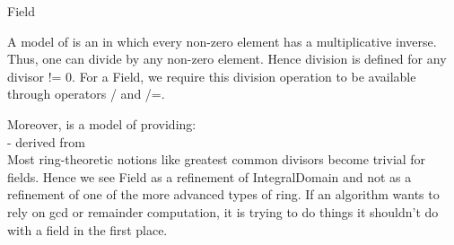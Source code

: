 \begin{ccRefConcept}{Field}


\ccDefinition

A model of  is an in which every non-zero element
has a multiplicative inverse. 
Thus, one can divide by any non-zero element. 
Hence division is defined for any divisor != 0. 
For a Field, we require this division operation to be available through 
operators / and /=.

Moreover,  is a model of 
 providing:\\
-  derived 
from  \\

Most ring-theoretic notions like greatest common divisors become trivial for 
fields. Hence we see Field as a refinement of IntegralDomain and not as a 
refinement of one of the more advanced types of ring. 
If an algorithm wants to rely on gcd or remainder computation, it is trying 
to do things it shouldn't do with a field in the first place. 
  
\ccRefines

\ccOperations
{}
\ccGlue
{}

\ccSeeAlso

\\
\\
\\
\\
\\
\\
\\
\\
\\




\end{ccRefConcept}
